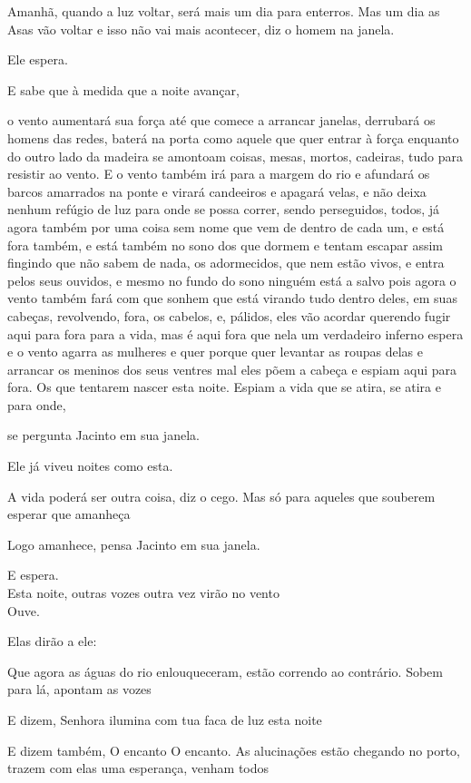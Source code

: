 Amanhã, quando a luz voltar, será mais um dia para enterros. Mas um dia
as Asas vão voltar e isso não vai mais acontecer, diz o homem na janela.

Ele espera.

E sabe que à medida que a noite avançar,

o vento aumentará sua força até que comece a arrancar janelas, derrubará
os homens das redes, baterá na porta como aquele que quer entrar à força
enquanto do outro lado da madeira se amontoam coisas, mesas, mortos,
cadeiras, tudo para resistir ao vento. E o vento também irá para a
margem do rio e afundará os barcos amarrados na ponte e virará
candeeiros e apagará velas, e não deixa nenhum refúgio de luz para onde
se possa correr, sendo perseguidos, todos, já agora também por uma coisa
sem nome que vem de dentro de cada um, e está fora também, e está também
no sono dos que dormem e tentam escapar assim fingindo que não sabem de
nada, os adormecidos, que nem estão vivos, e entra pelos seus ouvidos, e
mesmo no fundo do sono ninguém está a salvo pois agora o vento também
fará com que sonhem que está virando tudo dentro deles, em suas cabeças,
revolvendo, fora, os cabelos, e, pálidos, eles vão acordar querendo
fugir aqui para fora para a vida, mas é aqui fora que nela um verdadeiro
inferno espera e o vento agarra as mulheres e quer porque quer levantar
as roupas delas e arrancar os meninos dos seus ventres mal eles põem a
cabeça e espiam aqui para fora. Os que tentarem nascer esta noite.
Espiam a vida que se atira, se atira e para onde,

se pergunta Jacinto em sua janela.

Ele já viveu noites como esta.

A vida poderá ser outra coisa, diz o cego. Mas só para aqueles que
souberem esperar que amanheça

Logo amanhece, pensa Jacinto em sua janela.

E espera.\\

Esta noite, outras vozes outra vez virão no vento\\

Ouve.

Elas dirão a ele:

Que agora as águas do rio enlouqueceram, estão correndo ao contrário.
Sobem para lá, apontam as vozes

E dizem, Senhora ilumina com tua faca de luz esta noite

E dizem também, O encanto O encanto. As alucinações estão chegando no
porto, trazem com elas uma esperança, venham todos

